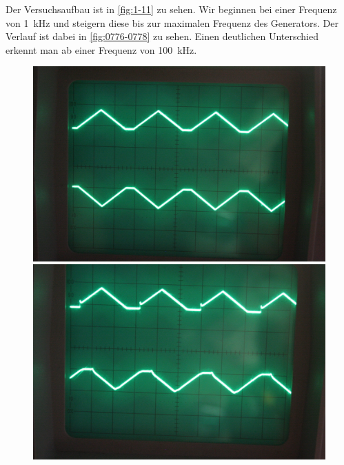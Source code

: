 Der Versuchsaufbau ist in \ref{fig:1-11} zu sehen. Wir beginnen bei einer Frequenz von \SI{1}{\kilo\hertz} und steigern diese bis zur maximalen Frequenz des Generators. Der Verlauf ist dabei in \ref{fig:0776-0778} zu sehen. Einen deutlichen Unterschied erkennt man ab einer Frequenz von \SI{100}{\kilo\hertz}.

\begin{figure}[htbp]
	\centering
	\begin{minipage}{.3\linewidth}
	\includegraphics[width=\linewidth]{Fotos/IMG_0776-1500.jpg}
	\end{minipage}
	\hfill
	\begin{minipage}{.3\linewidth}
	\includegraphics[width=\linewidth]{Fotos/IMG_0777-1500.jpg}
	\end{minipage}
	\hfill
	\begin{minipage}{.3\linewidth}

\end{minipage}
\end{figure}
